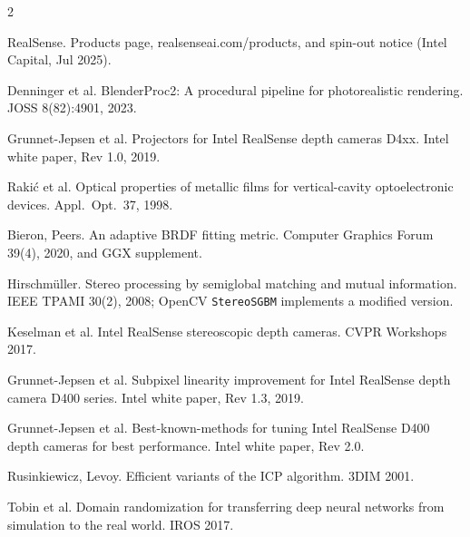 \documentclass[10pt,a4paper]{article}
\begin{document}
{\begin{multicols}{2}
\begin{enumerate}[leftmargin=1.7em,label={[\arabic*]},itemsep=0.4pt,topsep=0pt]
\item RealSense. Products page, realsenseai.com/products, and spin-out notice (Intel Capital, Jul 2025).
\item Denninger et al. BlenderProc2: A procedural pipeline for photorealistic rendering. JOSS 8(82):4901, 2023.
\item Grunnet-Jepsen et al. Projectors for Intel RealSense depth cameras D4xx. Intel white paper, Rev 1.0, 2019.
\item Rakić et al. Optical properties of metallic films for vertical-cavity optoelectronic devices. Appl.\ Opt.\ 37, 1998.
\item Bieron, Peers. An adaptive BRDF fitting metric. Computer Graphics Forum 39(4), 2020, and GGX supplement.
\item Hirschmüller. Stereo processing by semiglobal matching and mutual information. IEEE TPAMI 30(2), 2008; OpenCV \texttt{StereoSGBM} implements a modified version.
\item Keselman et al. Intel RealSense stereoscopic depth cameras. CVPR Workshops 2017.
\item Grunnet-Jepsen et al. Subpixel linearity improvement for Intel RealSense depth camera D400 series. Intel white paper, Rev 1.3, 2019.
\item Grunnet-Jepsen et al. Best-known-methods for tuning Intel RealSense D400 depth cameras for best performance. Intel white paper, Rev 2.0.
\item Rusinkiewicz, Levoy. Efficient variants of the ICP algorithm. 3DIM 2001.
\item Tobin et al. Domain randomization for transferring deep neural networks from simulation to the real world. IROS 2017.
\end{enumerate}
\end{multicols}
}
\end{document}
